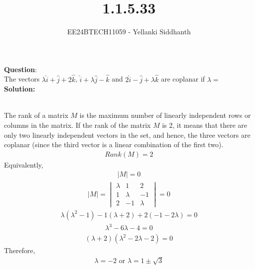 \documentclass[journal]{IEEEtran}
\begin{document}

\vspace{3cm}

\title{1.1.5.33}
\author{EE24BTECH11059 - Yellanki Siddhanth
}
{\let\newpage\relax\maketitle}

\renewcommand{\thefigure}{\theenumi}
\renewcommand{\thetable}{\theenumi}
\setlength{\intextsep}{10pt} %


\renewcommand{\thetable}{\theenumi}


\textbf{Question}:\\

The vectors $\lambda\hat{i} + \hat{j} +2\hat{k}$, $\hat{i} + \lambda\hat{j} - \hat{k}$ and $2\hat{i} - \hat{j} +\lambda\hat{k}$  are coplanar if $\lambda = $
\\ \textbf{Solution: }\\
    \begin{table}[h!]    
      \centering
      
      \caption{}
    \end{table}\\
The rank of a matrix $M$ is the maximum number of linearly independent rows or columns in the matrix. If the rank of the matrix $M$ is 2, it means that there are only two linearly independent vectors in the set, and hence, the three vectors are coplanar (since the third vector is a linear combination of the first two).
    \begin{align}
        Rank(M) = 2\label{eq1.1.6.19.1}
    \end{align}
Equivalently,
    \begin{align}
        |M| = 0 \label{eq1.1.6.19.2}
    \end{align}
    \begin{align}
        |M| = \begin{vmatrix}\lambda & 1 & 2 \\ 1 & \lambda & -1 \\ 2 & -1 & \lambda\end{vmatrix}=0\label{eq1.1.6.19.3}
    \end{align}
    \begin{align}
        \lambda(\lambda^2 - 1) - 1(\lambda+2) + 2(-1-2\lambda) = 0  \label{eq1.1.6.19.4}
    \end{align}
    \begin{align}
        \lambda^3 - 6\lambda - 4 = 0  \label{eq1.1.6.19.5}
    \end{align}
    \begin{align}
        (\lambda + 2)(\lambda^2 - 2\lambda - 2) = 0  \label{eq1.1.6.19.6}
    \end{align}
Therefore,
    \begin{align}
         \lambda = -2 \text{ or } \lambda = 1 \pm \sqrt{3}\label{eq1.1.6.19.6}
    \end{align}
    
\end{document}
